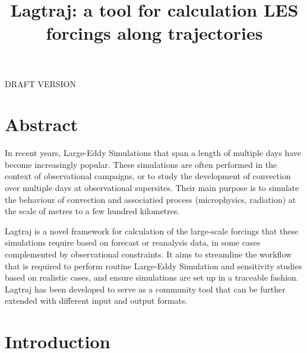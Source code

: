\documentclass[a4paper,11pt]{article}
\title{Lagtraj: a tool for calculation LES forcings along trajectories}
\begin{document}
\maketitle

DRAFT VERSION

\section*{Abstract}

In recent years, Large-Eddy Simulations that span a length of
multiple days have become increasingly popular. These simulations are
often performed in the context of observational campaigns, or to study
the development of convection over multiple days at observational
supersites. Their main purpose is to simulate the behaviour of
convection and associatied process (microphysics, radiation) at the
scale of metres to a few hundred kilometres.


Lagtraj is a novel framework for calculation of the large-scale
forcings that these simulations require based on forecast or reanalysis
data, in some cases complemented by observational constraints. It aims
to streamline the workflow that is required to perform routine
Large-Eddy Simulation and sensitivity studies based on realistic cases,
and ensure simulations are set up in a traceable fashion. Lagtraj has
been developed to serve as a community tool that can be further
extended with different input and output formats.

\section{Introduction}
\end{document}
